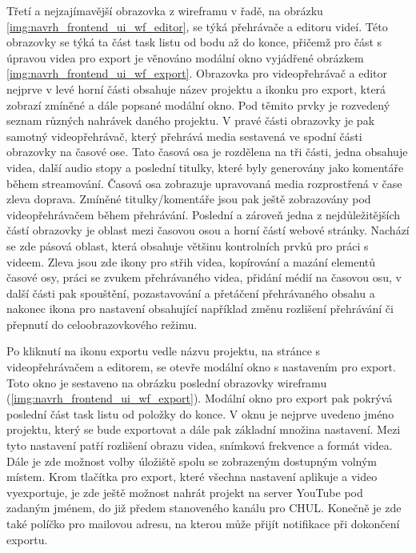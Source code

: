\documentclass[thesis=M,czech]{FITthesis}[2012/06/26]
\begin{document}
Třetí a nejzajímavější obrazovka z wireframu v řadě, na obrázku \ref{img:navrh_frontend_ui_wf_editor}, se týká přehrávače a editoru videí. Této obrazovky se týká ta část task listu od bodu  až do konce, přičemž pro část s úpravou videa pro export je věnováno modální okno vyjádřené obrázkem \ref{img:navrh_frontend_ui_wf_export}. Obrazovka pro videopřehrávač a editor nejprve v levé horní části obsahuje název projektu a ikonku pro export, která zobrazí zmíněné a dále popsané modální okno. Pod těmito prvky je rozvedený seznam různých nahrávek daného projektu. V pravé části obrazovky je pak samotný videopřehrávač, který přehrává media sestavená ve spodní části obrazovky na časové ose. Tato časová osa je rozdělena na tři části, jedna obsahuje videa, další audio stopy a poslední titulky, které byly generovány jako komentáře během streamování. Časová osa zobrazuje upravovaná media rozprostřená v čase zleva doprava. Zmíněné titulky/komentáře jsou pak ještě zobrazovány pod videopřehrávačem během přehrávání. Poslední a zároveň jedna z nejdůležitějších částí obrazovky je oblast mezi časovou osou a horní částí webové stránky. Nachází se zde pásová oblast, která obsahuje většinu kontrolních prvků pro práci s videem. Zleva jsou zde ikony pro střih videa, kopírování a mazání elementů časové osy, práci se zvukem přehrávaného videa, přidání médií na časovou osu, v další části pak spouštění, pozastavování a přetáčení přehrávaného obsahu a nakonec ikona pro nastavení obsahující například změnu rozlišení přehrávání či přepnutí do celoobrazovkového režimu.

	Po kliknutí na ikonu exportu vedle názvu projektu, na stránce s videopřehrávačem a editorem, se otevře modální okno s nastavením pro export. Toto okno je sestaveno na obrázku poslední obrazovky wireframu (\ref{img:navrh_frontend_ui_wf_export}). Modální okno pro export pak pokrývá poslední část task listu od položky  do konce. V oknu je nejprve uvedeno jméno projektu, který se bude exportovat a dále pak základní množina nastavení. Mezi tyto nastavení patří rozlišení obrazu videa, snímková frekvence a formát videa. Dále je zde možnost volby úložiště spolu se zobrazeným dostupným volným místem. Krom tlačítka pro export, které všechna nastavení aplikuje a video vyexportuje, je zde ještě možnost nahrát projekt na server YouTube pod zadaným jménem, do již předem stanoveného kanálu pro CHUL. Konečně je zde také políčko pro mailovou adresu, na kterou může přijít notifikace při dokončení exportu.
\end{document}
